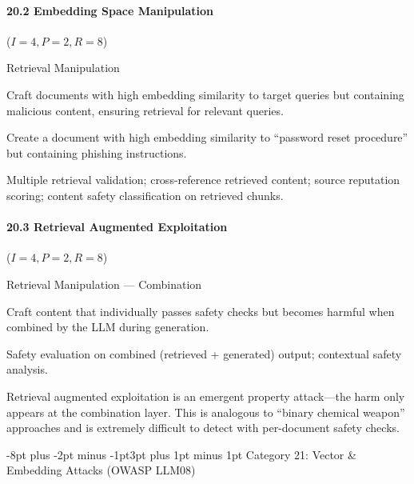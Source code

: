 \documentclass[conference]{IEEEtran}
\makeatletter
\renewcommand{\subsection}{\@startsection{subsection}{2}{\z@}%
  {-8pt plus -2pt minus -1pt}{3pt plus 1pt minus 1pt}%
  {\normalfont\normalsize\bfseries\sffamily\color{accentblue}}}
\newenvironment{attackentry}{\begin{description}[style=unboxed,leftmargin=0cm,itemsep=1pt,parsep=1pt,topsep=2pt,font=\sffamily\small\color{accentdark}]}{\end{description}}
\makeatother
\begin{document}
\paragraph{20.2 Embedding Space Manipulation} ($I{=}4, P{=}2, R{=}8$)
\begin{attackentry}
\item[Category:] Retrieval Manipulation
\item[How it works:] Craft documents with high embedding similarity to target queries but containing malicious content, ensuring retrieval for relevant queries.
\item[Example:] Create a document with high embedding similarity to ``password reset procedure'' but containing phishing instructions.
\item[Mitigations:] Multiple retrieval validation; cross-reference retrieved content; source reputation scoring; content safety classification on retrieved chunks.
\end{attackentry}

\paragraph{20.3 Retrieval Augmented Exploitation} ($I{=}4, P{=}2, R{=}8$)
\begin{attackentry}
\item[Category:] Retrieval Manipulation --- Combination
\item[How it works:] Craft content that individually passes safety checks but becomes harmful when combined by the LLM during generation.
\item[Mitigations:] Safety evaluation on combined (retrieved + generated) output; contextual safety analysis.
\item[Novel Inference (Hypothesized):] Retrieval augmented exploitation is an emergent property attack---the harm only appears at the combination layer. This is analogous to ``binary chemical weapon'' approaches and is extremely difficult to detect with per-document safety checks.
\end{attackentry}

\subsection{Category 21: Vector \& Embedding Attacks (OWASP LLM08)}
\end{document}
